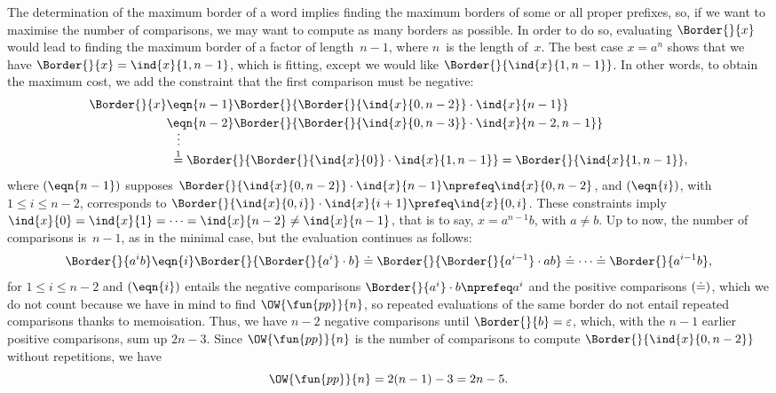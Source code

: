 The determination of the maximum border of a word implies finding the
maximum borders of some or all proper prefixes, so, if we want to
maximise the number of comparisons, we may want to compute as many
borders as possible. In order to do so, evaluating \(\Border{}{x}\)
would lead to finding the maximum border of a factor of
length~\(n-1\), where \(n\)~is the length of~\(x\). The best case
\(x=a^{n}\) shows that we have \(\Border{}{x} = \ind{x}{1,n-1}\),
which is fitting, except we would like
\(\Border{}{\ind{x}{1,n-1}}\). In other words, to obtain the maximum
cost, we add the constraint that the first comparison must be
negative:
\begin{align*}
\Border{}{x}
&\eqn{n-1} \Border{}{\Border{}{\ind{x}{0,n-2}} \cdot \ind{x}{n-1}}\\
&\eqn{n-2} \Border{}{\Border{}{\ind{x}{0,n-3}} \cdot \ind{x}{n-2,n-1}}\\
&\;\;\;\smash{\vdots}\\
&\;\mathrel{\stackrel{\smash[t]{1}}{=}}
  \Border{}{\Border{}{\ind{x}{0}} \cdot \ind{x}{1,n-1}}
= \Border{}{\ind{x}{1,n-1}},
\end{align*}
where \((\smash{\eqn{n-1}})\) supposes \(\Border{}{\ind{x}{0,n-2}}
\cdot \ind{x}{n-1} \nprefeq \ind{x}{0,n-2}\), and
\((\smash{\eqn{i}})\), with \(1 \leqslant i \leqslant n-2\),
corresponds to \(\Border{}{\ind{x}{0,i}} \cdot \ind{x}{i+1} \prefeq
\ind{x}{0,i}\). These constraints imply \(\ind{x}{0} = \ind{x}{1} =
\dots = \ind{x}{n-2} \neq \ind{x}{n-1}\), that is to say,
\(x=a^{n-1}b\), with \(a \neq b\). Up to now, the number of
comparisons is~\(n-1\), as in the minimal case, but the evaluation
continues as follows:
\begin{equation*}
\Border{}{a^{i}b}
\eqn{i} \Border{}{\Border{}{a^{i}} \cdot b}\\
\doteq \Border{}{\Border{}{a^{i-1}} \cdot ab}\\
\doteq \dots \doteq \Border{}{a^{i-1}b},
\end{equation*}
for \(1 \leqslant i \leqslant n-2\) and \((\smash{\eqn{i}})\) entails
the negative comparisons \(\Border{}{a^{i}} \cdot b \nprefeq a^{i}\)
and the positive comparisons \((\smash{\doteq})\), which we do not
count because we have in mind to find
\(\OW{\fun{pp}}{n}\), so repeated
evaluations of the same border do not entail repeated comparisons
thanks to memoisation. Thus, we have \(n-2\)
negative comparisons until \(\Border{}{b} = \varepsilon\), which, with
the \(n-1\) earlier positive comparisons, sum up \(2n-3\). Since
\(\OW{\fun{pp}}{n}\) is the number of comparisons to compute
\(\Border{}{\ind{x}{0,n-2}}\) without repetitions, we have
\begin{equation*}
\belowdisplayskip=0pt
\OW{\fun{pp}}{n} = 2(n-1)-3 = 2n - 5.
\end{equation*}

